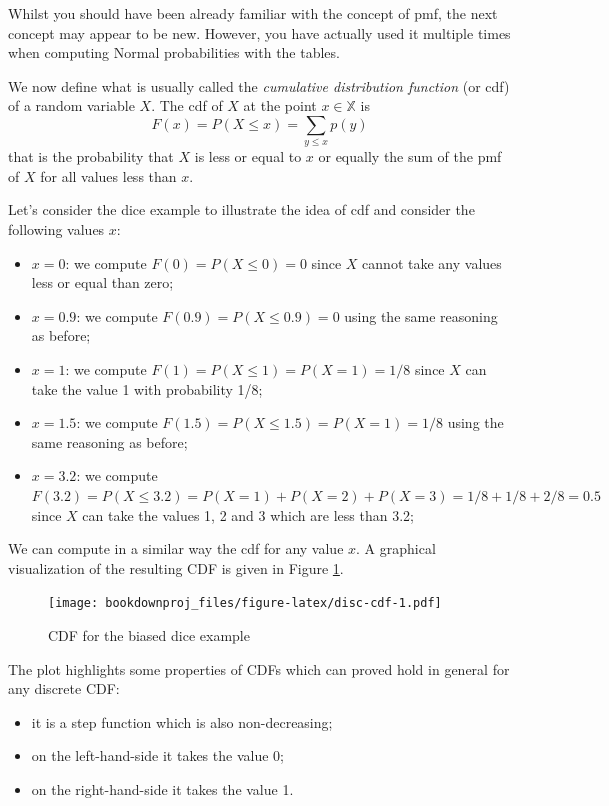 \documentclass[
]{book}
\begin{document}
Whilst you should have been already familiar with the concept of pmf, the next concept may appear to be new. However, you have actually used it multiple times when computing Normal probabilities with the tables.

We now define what is usually called the \emph{cumulative distribution function} (or cdf) of a random variable \(X\). The cdf of \(X\) at the point \(x\in\mathbb{X}\) is
\[
F(x) = P(X \leq x) = \sum_{y \leq x} p(y)
\]
that is the probability that \(X\) is less or equal to \(x\) or equally the sum of the pmf of \(X\) for all values less than \(x\).

Let's consider the dice example to illustrate the idea of cdf and consider the following values \(x\):

\begin{itemize}
\item
  \(x=0\): we compute \(F(0) = P(X\leq 0 )= 0\) since \(X\) cannot take any values less or equal than zero;
\item
  \(x= 0.9\): we compute \(F(0.9)= P(X\leq 0.9) = 0\) using the same reasoning as before;
\item
  \(x = 1\): we compute \(F(1)= P(X\leq 1) = P(X=1) = 1/8\) since \(X\) can take the value 1 with probability 1/8;
\item
  \(x = 1.5\): we compute \(F(1.5) = P(X\leq 1.5) = P(X=1) = 1/8\) using the same reasoning as before;
\item
  \(x = 3.2\): we compute \(F(3.2)=P(X\leq 3.2)=P(X=1)+ P(X=2) + P(X=3)=1/8 + 1/8 + 2/8 = 0.5\) since \(X\) can take the values 1, 2 and 3 which are less than 3.2;
\end{itemize}

We can compute in a similar way the cdf for any value \(x\). A graphical visualization of the resulting CDF is given in Figure \ref{fig:disc-cdf}.

\begin{figure}
\centering
\texttt{[image: bookdownproj\_files/figure-latex/disc-cdf-1.pdf]}
\caption{\label{fig:disc-cdf}CDF for the biased dice example}
\end{figure}

The plot highlights some properties of CDFs which can proved hold in general for any discrete CDF:

\begin{itemize}
\item
  it is a step function which is also non-decreasing;
\item
  on the left-hand-side it takes the value 0;
\item
  on the right-hand-side it takes the value 1.
\end{itemize}
\end{document}
